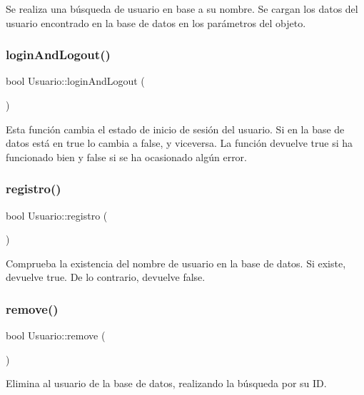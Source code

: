 Se realiza una búsqueda de usuario en base a su nombre. Se cargan los datos del usuario encontrado en la base de datos en los parámetros del objeto. \mbox{\label{classUsuario_a03850510ec70df9a5da7f31e66034d8a}} 
\subsubsection{\texorpdfstring{login\+And\+Logout()}{loginAndLogout()}}
{\footnotesize\ttfamily bool Usuario\+::login\+And\+Logout (\begin{DoxyParamCaption}{ }\end{DoxyParamCaption})}

Esta función cambia el estado de inicio de sesión del usuario. Si en la base de datos está en true lo cambia a false, y viceversa. La función devuelve true si ha funcionado bien y false si se ha ocasionado algún error. \mbox{\label{classUsuario_aea05bcbf762bc5c6d1e33990f2c52bf4}} 
\subsubsection{\texorpdfstring{registro()}{registro()}}
{\footnotesize\ttfamily bool Usuario\+::registro (\begin{DoxyParamCaption}{ }\end{DoxyParamCaption})}

Comprueba la existencia del nombre de usuario en la base de datos. Si existe, devuelve true. De lo contrario, devuelve false. \mbox{\label{classUsuario_a2e01f0e772aabe9c66ef326eca458405}} 
\subsubsection{\texorpdfstring{remove()}{remove()}}
{\footnotesize\ttfamily bool Usuario\+::remove (\begin{DoxyParamCaption}{ }\end{DoxyParamCaption})}

Elimina al usuario de la base de datos, realizando la búsqueda por su ID. \mbox{\label{classUsuario_abccc47bddb1deac69920f4dcb7a44b97}} 
